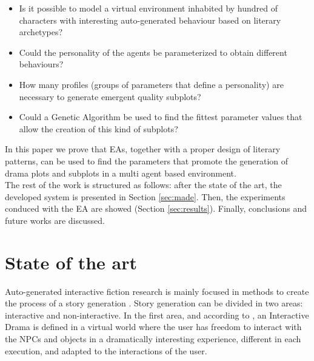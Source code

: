 \documentclass[runningheads]{llncs}
\begin{document}
\begin{itemize}
 \item Is it possible to model a virtual environment inhabited by hundred of characters with interesting auto-generated behaviour based on literary archetypes?
 \item Could the personality of the agents be parameterized to obtain different behaviours? 
 \item How many profiles (groups of parameters that define a personality) are necessary to generate emergent quality subplots?
 \item Could a Genetic Algorithm be used to find the fittest parameter values that allow the creation of this kind of subplots?

\end{itemize}


In this paper we prove that EAs, together with a proper design of literary patterns, can be used to find the parameters that promote the generation of drama plots and subplots in a multi agent based environment.\\

The rest of the work is structured as follows: after the state of the art, the developed system is presented in Section \ref{sec:made}. Then, the experiments conduced with the EA are showed (Section \ref{sec:results}). Finally, conclusions and future works are discussed.


\section{State of the art}
\label{sec:soa}


Auto-generated interactive fiction research is mainly focused in methods to create the process of a story generation \cite{nairat2011character}. Story generation can be divided in two areas: interactive and non-interactive. In the first area, and according to \cite{ReviewArinbjarnar09}, an Interactive Drama is defined in a virtual world where the user has freedom to interact with the NPCs and objects in a dramatically interesting experience, different in each execution, and adapted to the interactions of the user.
\end{document}

